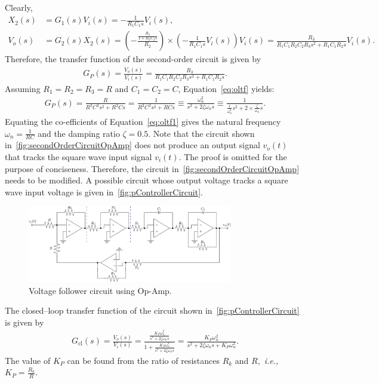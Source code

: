 %
Clearly, %
\begin{align*}
  X_2(s) &= G_1(s)V_i(s) = -\frac{1}{R_1C_1s}V_i(s),\\
  V_o(s) &= G_2(s)X_2(s) = \left(-\frac{\frac{R_3}{1+R_3C_2s}}{R_2}\right)\times 			
           \left(-\frac{1}{R_1C_1s}V_i(s)\right)V_i(s)= \frac{R_3}{R_1C_1R_2C_2R_3s^2+R_1C_1R_2s}V_i(s).  
\end{align*}
%
Therefore, the transfer function of the second-order circuit is given by %
%
\begin{align}
  G_P(s)=\frac{V_o(s)}{V_i(s)} = \frac{R_3}{R_1C_1R_2C_2R_3s^2+R_1C_1R_2s}.
  \label{eq:oltf}
\end{align}
%
Assuming $R_1=R_2=R_3=R$ and $C_1=C_2=C$, Equation~\eqref{eq:oltf} yields:
	\begin{align}
          G_P(s) = \frac{R}{R^3C^2s^2+R^2Cs}= \frac{1}{R^2C^2s^2+RCs} \equiv \frac{\omega_n^2}{s^2+2\zeta\omega_ns}\equiv\frac{1}{\frac{1}{\omega_n^2}s^2+2\times \frac{\zeta}{\omega_n}s}.
          \label{eq:oltf1}
	\end{align}
Equating the co-efficients of Equation~\eqref{eq:oltf1} gives the natural frequency $\omega_n= \frac{1}{RC}$ and the damping ratio $\zeta=0.5.$  Note that the circuit shown in~\autoref{fig:secondOrderCircuitOpAmp} does not produce an output signal $v_o(t)$ that tracks the square wave input signal $v_i(t).$ The proof is omitted for the purpose of conciseness. Therefore, the circuit in~\autoref{fig:secondOrderCircuitOpAmp} needs to be modified. A possible circuit whose output voltage tracks a square wave input voltage is given in~\autoref{fig:pControllerCircuit}. %
%
\begin{figure}[htbp]
  \centering
  \includegraphics[width=0.8\textwidth]{figs/ipe/lab8/pControllerCircuit}
  \caption[]{Voltage follower circuit using Op-Amp.}
  \label{fig:pControllerCircuit}
\end{figure}
%


The closed--loop transfer function of the circuit shown in~\autoref{fig:pControllerCircuit} is given by %
%
\begin{align}
  \boxed{
  G_{\text{cl}}(s) = \frac{V_o(s)}{V_i(s)}=\frac{\frac{K_P\omega_n^2}{s^2+2\zeta\omega_ns}}{1+\frac{K_P\omega_n^2}{s^2+2\zeta\omega_ns}}=\frac{K_P\omega_n^2}{s^2+2\zeta\omega_ns+K_P\omega_n^2}.}
\end{align}
%
The value of $K_P$ can be found from the ratio of resistances $R_k$ and $R,$ \textit{i.e.,}~$K_P=\frac{R_k}{R}.$

